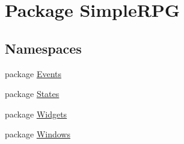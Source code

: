 \hypertarget{namespace_simple_r_p_g}{\section{Package Simple\+R\+P\+G}
\label{namespace_simple_r_p_g}
}
\subsection*{Namespaces}
\begin{DoxyCompactItemize}
\item 
package \hyperlink{namespace_simple_r_p_g_1_1_events}{Events}
\item 
package \hyperlink{namespace_simple_r_p_g_1_1_states}{States}
\item 
package \hyperlink{namespace_simple_r_p_g_1_1_widgets}{Widgets}
\item 
package \hyperlink{namespace_simple_r_p_g_1_1_windows}{Windows}
\end{DoxyCompactItemize}
